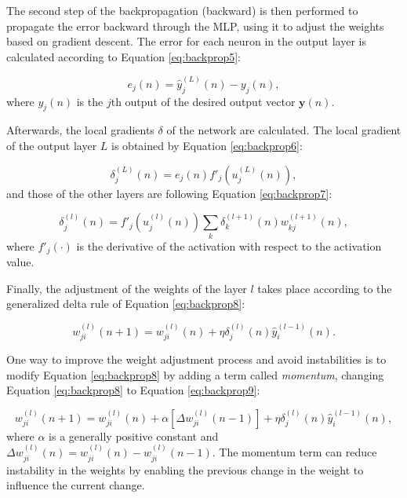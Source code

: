 %

The second step of the backpropagation (backward) is then performed to propagate the error backward through the MLP, using it to adjust the weights based on gradient descent. The error for each neuron in the output layer is calculated according to Equation \ref{eq:backprop5}: 

\begin{equation}
    \label{eq:backprop5}
    e_j (n) = \hat{y}^{(L)}_j(n) - y_j (n),
\end{equation}
where $y_j (n)$ is the $j$th output of the desired output vector $\mathbf{y}(n)$.

Afterwards, the local gradients $\delta$ of the network are calculated. The local gradient of the output layer $L$ is obtained by Equation \ref{eq:backprop6}:

\begin{equation}
    \label{eq:backprop6}
    \delta_j^{(L)} (n) = e_j(n) {f}'_j (u_j^{(L)}(n)),
\end{equation}
and those of the other layers are following Equation \ref{eq:backprop7}:

\begin{equation}
    \label{eq:backprop7}
    \delta_j^{(l)} (n) = {f}'_j (u_j^{(l)}(n)) \sum_k \delta_k^{(l+1)} (n) w_{kj}^{(l+1)}(n),
\end{equation}
where ${f}'_j(\cdot)$ is the derivative of the activation with respect to the activation value.

Finally, the adjustment of the weights of the layer $l$ takes place according to the generalized delta rule of Equation \ref{eq:backprop8}:

\begin{equation}
    \label{eq:backprop8}
    w_{ji}^{(l)} (n+1) = w_{ji}^{(l)}(n) + \eta \delta_j^{(l)}(n) \hat{y}_i^{(l-1)} (n).
\end{equation}

One way to improve the weight adjustment process and avoid instabilities is to modify Equation \ref{eq:backprop8} by adding a term called \textit{momentum}, changing Equation \ref{eq:backprop8} to Equation \ref{eq:backprop9}:

\begin{equation}
\label{eq:backprop9}
    w_{ji}^{(l)} (n+1) = w_{ji}^{(l)}(n) + \alpha[\Delta w_{ji}^{(l)}(n-1)] + \eta \delta_j^{(l)}(n) \hat{y}_i^{(l-1)} (n),
\end{equation}
where $\alpha$ is a generally positive constant and $\Delta w_{ji}^{(l)}(n) = w_{ji}^{(l)}(n) - w_{ji}^{(l)}(n-1)$. The momentum term can reduce instability in the weights by enabling the previous change in the weight to influence the current change.

